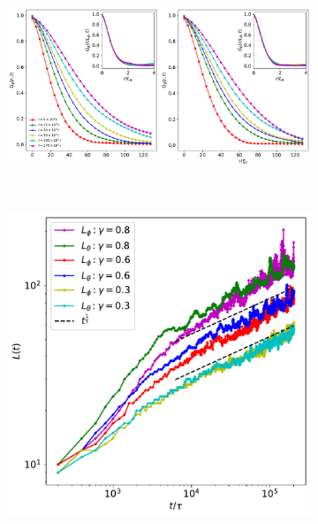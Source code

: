 \begin{figure}
    \begin{subfigure}{\textwidth}
        \centering
        \includegraphics[width=\textwidth]{
            gfx/ch-twoCompDynamics/correlations.pdf}
        \caption{\label{fig:correlation-functions}}
    \end{subfigure}\\
    \begin{subfigure}{0.5\textwidth}
        \centering
        \includegraphics[width=\textwidth]{
            gfx/ch-twoCompDynamics/correlation_lengths.pdf}
        \caption{\label{fig:correlation-lengths}}
    \end{subfigure}
    \begin{subfigure}{0.5\textwidth}

\end{subfigure}
\end{figure}
